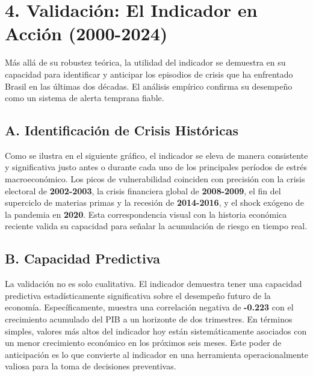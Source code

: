 \documentclass[11pt,a4paper]{article}
\begin{document}
\section*{4. Validación: El Indicador en Acción (2000-2024)}

Más allá de su robustez teórica, la utilidad del indicador se demuestra en su capacidad para identificar y anticipar los episodios de crisis que ha enfrentado Brasil en las últimas dos décadas. El análisis empírico confirma su desempeño como un sistema de alerta temprana fiable.

\subsection*{A. Identificación de Crisis Históricas}
Como se ilustra en el siguiente gráfico, el indicador se eleva de manera consistente y significativa justo antes o durante cada uno de los principales períodos de estrés macroeconómico. Los picos de vulnerabilidad coinciden con precisión con la crisis electoral de \textbf{2002-2003}, la crisis financiera global de \textbf{2008-2009}, el fin del superciclo de materias primas y la recesión de \textbf{2014-2016}, y el shock exógeno de la pandemia en \textbf{2020}. Esta correspondencia visual con la historia económica reciente valida su capacidad para señalar la acumulación de riesgo en tiempo real.


\subsection*{B. Capacidad Predictiva}
La validación no es solo cualitativa. El indicador demuestra tener una capacidad predictiva estadísticamente significativa sobre el desempeño futuro de la economía. Específicamente, muestra una correlación negativa de \textbf{-0.223} con el crecimiento acumulado del PIB a un horizonte de dos trimestres. En términos simples, valores más altos del indicador hoy están sistemáticamente asociados con un menor crecimiento económico en los próximos seis meses. Este poder de anticipación es lo que convierte al indicador en una herramienta operacionalmente valiosa para la toma de decisiones preventivas.
\end{document}
